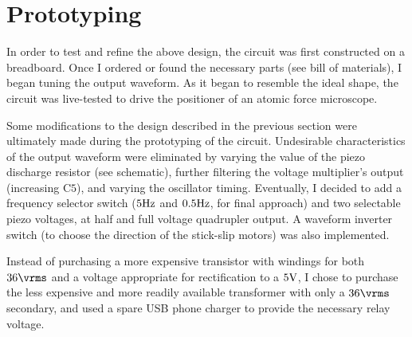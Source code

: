 \documentclass[12pt]{article}
\begin{document}
\section{Prototyping}
\par In order to test and refine the above design, the circuit was first constructed on a breadboard. Once I ordered or found the necessary parts (see bill of materials), I began tuning the output waveform. As it began to resemble the ideal shape, the circuit was live-tested to drive the positioner of an atomic force microscope.
\par Some modifications to the design described in the previous section were ultimately made during the prototyping of the circuit.
Undesirable characteristics of the output waveform were eliminated by varying the value of the piezo discharge resistor (see schematic), further filtering the voltage multiplier's output (increasing $\textrm{C5}$), and varying the oscillator timing.
Eventually, I decided to add a frequency selector switch ($5\hertz$ and $0.5\hertz$, for final approach) and two selectable piezo voltages, at half and full voltage quadrupler output. A waveform inverter switch (to choose the direction of the stick-slip motors) was also implemented.
\par Instead of purchasing a more expensive transistor with windings for both $36 \vrms$ and a voltage appropriate for rectification to a $5 \volt$, I chose to purchase the less expensive and more readily available transformer with only a $36 \vrms$ secondary, and used a spare USB phone charger to provide the necessary relay voltage.
\end{document}
